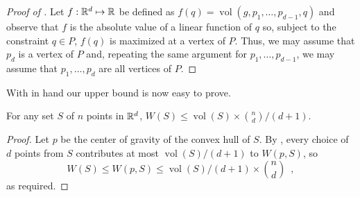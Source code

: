 \documentclass[lotsofwhite]{patmorin}
\DeclareMathOperator{\vol}{vol}
\begin{document}
\begin{proof}[Proof of ]
Let $f:\mathbb{R}^d\mapsto \mathbb{R}$ be defined as
$f(q)=\vol(g,p_1,\ldots,p_{d-1},q)$ and observe that $f$ is the
absolute value of a linear function of $q$ so, subject to the constraint
$q\in P$, $f(q)$ is maximized at a vertex of $P$.  Thus, we may assume
that $p_d$ is a vertex of $P$ and, repeating the same argument for
$p_1,\ldots,p_{d-1}$, we may assume that $p_1,\ldots,p_{d}$ are all
vertices of $P$.
\end{proof}


With  in hand our upper bound is now easy to prove.

\begin{thm}
For any set $S$ of $n$ points in $\mathbb{R}^d$, $W(S) \le \vol(S)\times {n \choose
d}/(d+1)$.
\end{thm}

\begin{proof}
Let $p$ be the center of gravity of the convex hull of $S$.  By
,
every choice of $d$ points from $S$ contributes at most
$\vol(S)/(d+1)$ to $W(p,S)$, so
\[
    W(S) \le W(p,S) \le \vol(S)/(d+1)\times {n\choose d} \enspace ,
\]
as required.
\end{proof}
\end{document}

